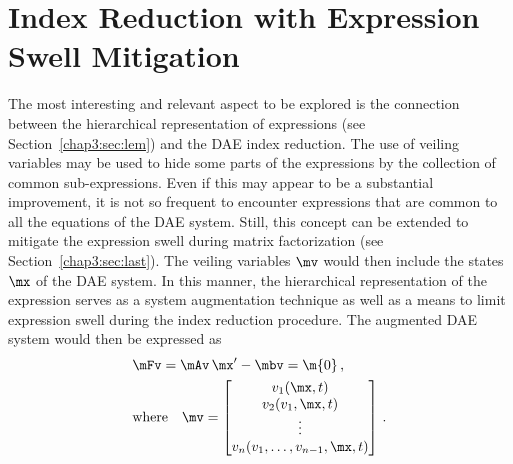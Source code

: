 
\section{Index Reduction with Expression Swell Mitigation}

The most interesting and relevant aspect to be explored is the connection between the hierarchical representation of expressions (see Section~\ref{chap3:sec:lem}) and the \ac{DAE} index reduction. The use of veiling variables may be used to hide some parts of the expressions by the collection of common sub-expressions. Even if this may appear to be a substantial improvement, it is not so frequent to encounter expressions that are common to all the equations of the \ac{DAE} system. Still, this concept can be extended to mitigate the expression swell during matrix factorization (see Section~\ref{chap3:sec:last}). The veiling variables $\mv$ would then include the states $\mx$ of the \ac{DAE} system. In this manner, the hierarchical representation of the expression serves as a system augmentation technique as well as a means to limit expression swell during the index reduction procedure. The augmented \ac{DAE} system would then be expressed as
%
\begin{subequations}
  \label{chap4:eq:augmented_dae}
  \begin{align}
    & \mFv = \mAv \, \mx^\prime - \mbv = \m{0} \, \text{,} \label{chap4:eq:augmented_dae_eqns} \\
    & \text{where} \quad
    \mv = \begin{bmatrix}
      v_{1}(\mx, t) \\
      v_{2}(v_{1}, \mx, t) \\
      \vdots \\
      v_{n}(v_{1}, \dots, v_{n-1}, \mx, t) \\
    \end{bmatrix} \, \text{.}
    \label{chap4:eq:augmented_dae_veil}
  \end{align}
\end{subequations}
%
